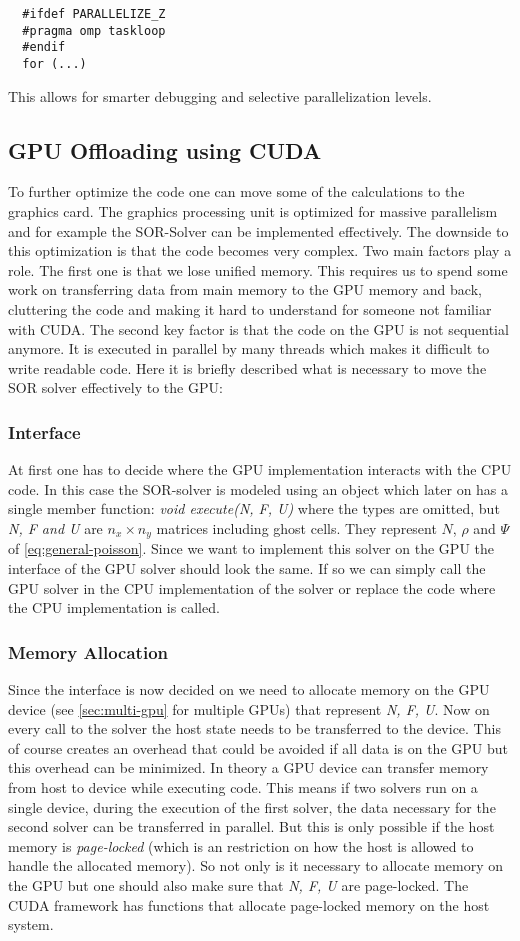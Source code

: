 \documentclass[master.tex]{subfiles}
\begin{document}
\begin{lstlisting}
  #ifdef PARALLELIZE_Z
  #pragma omp taskloop
  #endif
  for (...)
\end{lstlisting}
This allows for smarter debugging and selective parallelization levels.

\subsection{GPU Offloading using CUDA}
To further optimize the code one can move some of the calculations to the graphics card. The graphics processing unit is optimized for massive parallelism and for example the SOR-Solver can be implemented effectively. The downside to this optimization is that the code becomes very complex. Two main factors play a role. The first one is that we lose unified memory. This requires us to spend some work on transferring data from main memory to the GPU memory and back, cluttering the code and making it hard to understand for someone not familiar with CUDA. The second key factor is that the code on the GPU is not sequential anymore. It is executed in parallel by many threads which makes it difficult to write readable code.\newline
Here it is briefly described what is necessary to move the SOR solver effectively to the GPU:
\subsubsection{Interface}
At first one has to decide where the GPU implementation interacts with the CPU code. In this case the \ac{SOR}-solver is modeled using an object which later on has a single member function: \textit{void execute(N, F, U)} where the types are omitted, but \textit{N, F and U} are $n_x \times n_y$ matrices including ghost cells. They represent $N$, $\rho$ and $\Psi$ of \autoref{eq:general-poisson}. Since we want to implement this solver on the GPU the interface of the GPU solver should look the same. If so we can simply call the GPU solver in the CPU implementation of the solver or replace the code where the CPU implementation is called.
\subsubsection{Memory Allocation}
Since the interface is now decided on we need to allocate memory on the GPU device (see \autoref{sec:multi-gpu} for multiple GPUs) that represent \textit{N, F, U}. Now on every call to the solver the host state needs to be transferred to the device. This of course creates an overhead that could be avoided if all data is on the GPU but this overhead can be minimized. In theory a GPU device can transfer memory from host to device while executing code. This means if two solvers run on a single device, during the execution of the first solver, the data necessary for the second solver can be transferred in parallel. But this is only possible if the host memory is \textit{page-locked} (which is an restriction on how the host is allowed to handle the allocated memory). So not only is it necessary to allocate memory on the GPU but one should also make sure that \textit{N, F, U} are page-locked. The CUDA framework has functions that allocate page-locked memory on the host system.
\end{document}
